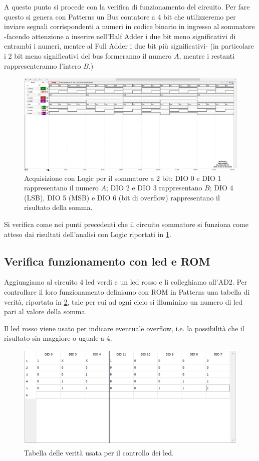 \documentclass[10pt, a4paper, italian]{article}
\begin{document}
A questo punto si procede con la verifica di funzionamento del circuito.
Per fare questo si genera con Patterns un Bus contatore a 4 bit che
utilizzeremo per inviare segnali corrispondenti a numeri in codice binario in
ingresso al sommatore -facendo attenzione a inserire nell'Half Adder i due
bit meno significativi di entrambi i numeri, mentre al Full Adder i due bit
più significativi- (in particolare i 2 bit meno significativi del bus
formeranno il numero $A$, mentre i restanti rappresenteranno l'intero $B$.)
\begin{figure}[htbp]
    \centering
    \includegraphics[width=\linewidth]{sum_time}
    \caption{Acquisizione con Logic per il sommatore a 2 bit: DIO 0 e DIO 1
    rappresentano il numero $A$; DIO 2 e DIO 3 rappresentano $B$; DIO 4 (LSB),
    DIO 5 (MSB) e DIO 6 (bit di overflow) rappresentano il risultato della
    somma.}
    \label{fig: faAD2}
\end{figure}
Si verifica come nei punti precedenti che il circuito sommatore si funziona
come atteso dai risultati dell'analisi con Logic riportati in
\cref{fig: faAD2}.

\subsection{Verifica funzionamento con led e ROM}
Aggiungiamo al circuito 4 led verdi e un led rosso e li colleghiamo all'AD2.
Per controllare il loro funzionamento definiamo con ROM in Patterns una
tabella di verità, riportata in \cref{fig: Ver}, tale per cui ad ogni ciclo
si illuminino un numero di led pari al valore della somma.

Il led rosso viene usato per indicare eventuale overflow, i.e. la possibilità
che il risultato sia maggiore o uguale a 4.
\begin{figure}[htbp]
    \centering
    \includegraphics[width=0.8\linewidth]{TAB_LED}
    \caption{Tabella delle verità usata per il controllo dei led.
    \label{fig: Ver}}
\end{figure}
\end{document}
